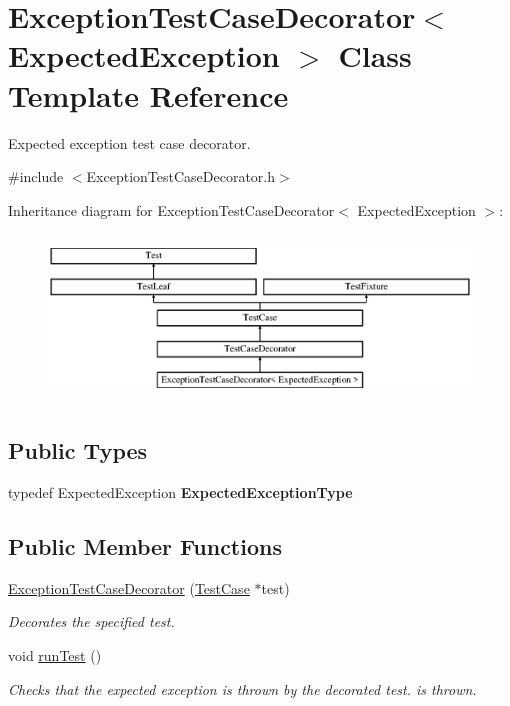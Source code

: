 \hypertarget{class_exception_test_case_decorator}{\section{Exception\-Test\-Case\-Decorator$<$ Expected\-Exception $>$ Class Template Reference}
\label{class_exception_test_case_decorator}
}


Expected exception test case decorator.  




{\ttfamily \#include $<$Exception\-Test\-Case\-Decorator.\-h$>$}

Inheritance diagram for Exception\-Test\-Case\-Decorator$<$ Expected\-Exception $>$\-:\begin{figure}[H]
\begin{center}
\leavevmode
\includegraphics[height=4.444445cm]{class_exception_test_case_decorator}
\end{center}
\end{figure}
\subsection*{Public Types}
\begin{DoxyCompactItemize}
\item 
\hypertarget{class_exception_test_case_decorator_a3fc7e11a4aa1730fa98ff6ac52958ae9}{typedef Expected\-Exception {\bfseries Expected\-Exception\-Type}}\label{class_exception_test_case_decorator_a3fc7e11a4aa1730fa98ff6ac52958ae9}

\end{DoxyCompactItemize}
\subsection*{Public Member Functions}
\begin{DoxyCompactItemize}
\item 
\hyperlink{class_exception_test_case_decorator_a01b0c42952450cff574dd9e293c718fa}{Exception\-Test\-Case\-Decorator} (\hyperlink{class_test_case}{Test\-Case} $\ast$test)
\begin{DoxyCompactList}\small\item\em Decorates the specified test. \end{DoxyCompactList}\item 
void \hyperlink{class_exception_test_case_decorator_a3f78294d459a94f55413162d814f291d}{run\-Test} ()
\begin{DoxyCompactList}\small\item\em Checks that the expected exception is thrown by the decorated test. is thrown. \end{DoxyCompactList}\end{DoxyCompactItemize}
